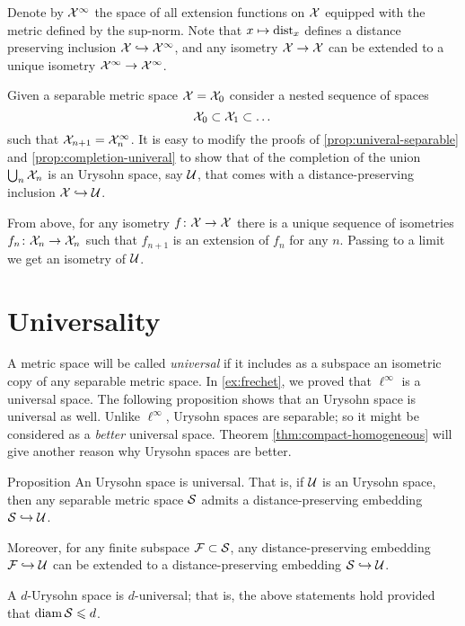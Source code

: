 Denote by $\mathcal{X}^\infty$ the space of all extension functions on $\mathcal{X}$ equipped with the metric defined by the sup-norm.
Note that $x\mapsto \mathrm{dist}_x$ defines a distance preserving inclusion $\mathcal{X} \hookrightarrow\mathcal{X}^\infty$, and
any isometry $\mathcal{X}\to \mathcal{X}$ can be extended to a unique isometry $\spc{X}^\infty\z\to \spc{X}^\infty$.

Given a separable metric space $\mathcal{X}=\mathcal{X}_0$ consider a nested sequence of spaces 
\[\mathcal{X}_0\subset \mathcal{X}_1\subset\dots\]
such that $\mathcal{X}_{n+1}=\mathcal{X}_{n}^\infty$.
It is easy to modify the proofs of \ref{prop:univeral-separable} and \ref{prop:completion-univeral} to show that of the completion of the union $\bigcup_n\mathcal{X}_{n}$ is an Urysohn space, say $\mathcal{U}$, that comes with a distance-preserving inclusion $\mathcal{X}\hookrightarrow \mathcal{U}$.

From above, for any isometry $f\colon \mathcal{X}\to \mathcal{X}$ there is a unique sequence of isometries $f_{n}\colon \mathcal{X}_{n}\to \mathcal{X}_{n}$ such that $f_{n+1}$ is an extension of $f_n$ for any $n$.
Passing to a limit we get an isometry of $\mathcal{U}$.
\qeds


\section{Universality}

A metric space will be called \emph{universal} if it includes as a subspace an isometric copy of any separable metric space.
In \ref{ex:frechet}, we proved that $\ell^\infty$ is a universal space. 
The following proposition shows that an Urysohn space is universal as well.
Unlike $\ell^\infty$, Urysohn spaces are separable;
so it might be considered as a \emph{better} universal space.
Theorem \ref{thm:compact-homogeneous} will give another reason why Urysohn spaces are better.

\begin{thm}{Proposition}\label{prop:sep-in-urys}
An Urysohn space is universal.
That is, if $\mathcal{U}$ is an Urysohn space, then any separable metric space $\mathcal{S}$ admits a distance-preserving embedding $\mathcal{S}\hookrightarrow\mathcal{U}$.

Moreover, for any finite subspace $\mathcal{F}\subset \mathcal{S}$,
any distance-preserving embedding $\mathcal{F}\hookrightarrow \mathcal{U}$ can be extended to a distance-preserving embedding $\mathcal{S}\hookrightarrow\mathcal{U}$.

A $d$-Urysohn space is $d$-universal;
that is, the above statements hold provided that $\operatorname{\rm diam}\nolimits\mathcal{S}\leqslant d$.  
\end{thm}

